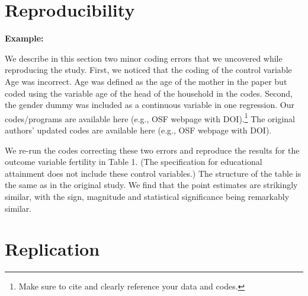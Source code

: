 \documentclass[12pt,a4paper]{article}
\begin{document}
\section{Reproducibility}





\textbf{Example:} 

We describe in this section two minor coding errors that we uncovered while reproducing the study. First, we noticed that the coding of the control variable Age was incorrect. Age was defined as the age of the mother in the paper but coded using the variable age of the head of the household in the codes. Second, the gender dummy was included as a continuous variable in one regression. Our codes/programs are available here (e.g., OSF webpage with DOI).\footnote{Make sure to cite and clearly reference your data and codes.} The original authors’ updated codes are available here (e.g., OSF webpage with DOI).

We re-run the codes correcting these two errors and reproduce the results for the outcome variable fertility in Table 1. (The specification for educational attainment does not include these control variables.) The structure of the table is the same as in the original study. We find that the point estimates are strikingly similar, with the sign, magnitude and statistical significance being remarkably similar.

\section{Replication}


\end{document}
